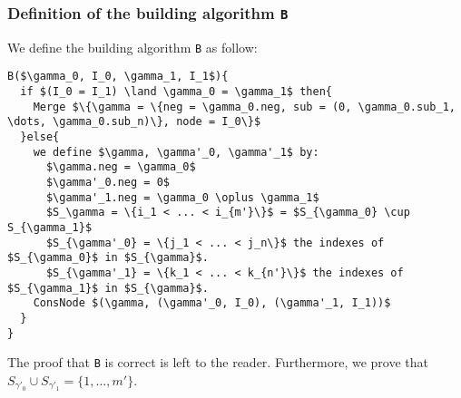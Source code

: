 \documentclass[a4paper,10pt]{article}
\begin{document}
\subsubsection{Definition of the building algorithm \texttt{B}\\}
We define the building algorithm \texttt{B} as follow:
\begin{lstlisting}
B($\gamma_0, I_0, \gamma_1, I_1$){
  if $(I_0 = I_1) \land \gamma_0 = \gamma_1$ then{
    Merge $\{\gamma = \{neg = \gamma_0.neg, sub = (0, \gamma_0.sub_1, \dots, \gamma_0.sub_n)\}, node = I_0\}$
  }else{
    we define $\gamma, \gamma'_0, \gamma'_1$ by:
      $\gamma.neg = \gamma_0$
      $\gamma'_0.neg = 0$
      $\gamma'_1.neg = \gamma_0 \oplus \gamma_1$
      $S_\gamma = \{i_1 < ... < i_{m'}\}$ = $S_{\gamma_0} \cup S_{\gamma_1}$
      $S_{\gamma'_0} = \{j_1 < ... < j_n\}$ the indexes of $S_{\gamma_0}$ in $S_{\gamma}$.
      $S_{\gamma'_1} = \{k_1 < ... < k_{n'}\}$ the indexes of $S_{\gamma_1}$ in $S_{\gamma}$.
    ConsNode $(\gamma, (\gamma'_0, I_0), (\gamma'_1, I_1))$
  }
}  
\end{lstlisting}
The proof that \texttt{B} is correct is left to the reader.
Furthermore, we prove that $S_{\gamma'_0}\cup S_{\gamma'_1} = \{1, \dots, m'\}$.
\end{document}
